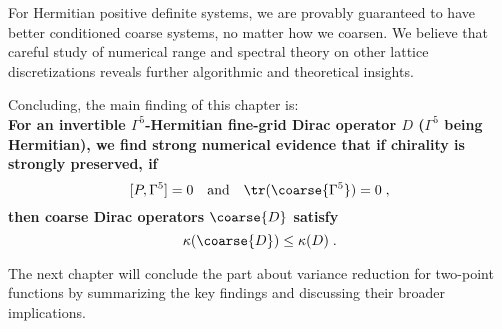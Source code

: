 
For Hermitian positive definite systems, we are provably guaranteed to have better conditioned coarse systems, no matter how we coarsen.
We believe that careful study of numerical range and spectral theory on other lattice discretizations reveals further algorithmic and theoretical insights.

Concluding, the main finding of this chapter is:\\
\textbf{
For an invertible $\Gamma^{5}$-Hermitian fine-grid Dirac operator $D$ ($\Gamma^{5}$ being Hermitian), we find strong numerical evidence that 
if chirality is strongly preserved, \ie if
\begin{equation} \label{eq:strong:chrality:preservation}
[P, \Gamma^{5}] = 0
\quad
\text{and}
\quad
\tr(\coarse{\Gamma^5}) = 0 \;,
\end{equation}
then coarse Dirac operators $\coarse{D}$ satisfy
\begin{equation}
\kappa(\coarse{D}) \leq \kappa(D) \;.
\end{equation}
}

The next chapter will conclude the part about variance reduction for two-point functions by summarizing the key findings and discussing their broader implications.

